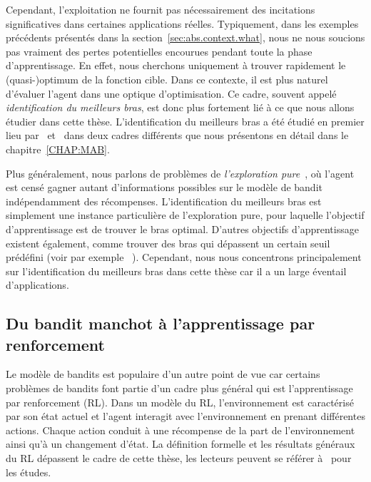 Cependant, l'exploitation ne fournit pas nécessairement des incitations significatives dans certaines applications réelles. Typiquement, dans les exemples précédents présentés dans la section~\ref{sec:abs.context.what}, nous ne nous soucions pas vraiment des pertes potentielles encourues pendant toute la phase d'apprentissage. En effet, nous cherchons uniquement à trouver rapidement le (quasi-)optimum de la fonction cible. Dans ce contexte, il est plus naturel d'évaluer l'agent dans une optique d'optimisation. Ce cadre, souvent appelé \emph{identification du meilleurs bras}, est donc plus fortement lié à ce que nous allons étudier dans cette thèse. L'identification du meilleurs bras a été étudié en premier lieu par~\cite{even-dar2003confidence} et~\cite{bubeck2009pure} dans deux cadres différents que nous présentons en détail dans le chapitre~\ref{CHAP:MAB}.

Plus généralement, nous parlons de problèmes de \emph{l'exploration pure}~\citep{bubeck2011pure}, où l'agent est censé gagner autant d'informations possibles sur le modèle de bandit indépendamment des récompenses. L'identification du meilleurs bras est simplement une instance particulière de l'exploration pure, pour laquelle l'objectif d'apprentissage est de trouver le bras optimal. D'autres objectifs d'apprentissage existent également, comme trouver des bras qui dépassent un certain seuil prédéfini (voir par exemple ~\citealt{locatelli2016thresholding}). Cependant, nous nous concentrons principalement sur l'identification du meilleurs bras dans cette thèse car il a un large éventail d'applications.

\subsection{Du bandit manchot \`a l'apprentissage par renforcement}\label{sec:abs.context.rl}

Le modèle de bandits est populaire d'un autre point de vue car certains problèmes de bandits font partie d'un cadre plus général qui est l'apprentissage par renforcement (RL). Dans un modèle du RL, l'environnement est caractérisé par son état actuel et l'agent interagit avec l'environnement en prenant différentes actions. Chaque action conduit à une récompense de la part de l'environnement ainsi qu'à un changement d'état. La définition formelle et les résultats généraux du RL dépassent le cadre de cette thèse, les lecteurs peuvent se référer à~\cite{sutton1998,bertsekas2011approximate} pour les études. 

